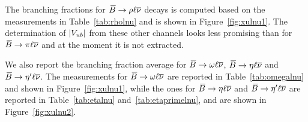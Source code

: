 The branching fractions for 
$\Bb\to \rho\ell\nub$ decays is computed based on the measurements in
Table~\ref{tab:rholnu} and is shown in Figure~\ref{fig:xulnu1}. The determination of $\Vub$
from these other channels looks less promising than for $\Bb\to\pi\ell\nub$ and at the moment it is not extracted.



We also report the branching fraction average for $\Bb\to\omega\ell\nub$, $\Bb\to\eta\ell\nub$ 
and $\Bb\to\eta'\ell\nub$. The measurements for $\Bb\to\omega\ell\nub$ are reported in Table~\ref{tab:omegalnu} 
and shown in Figure~\ref{fig:xulnu1}, while the ones for $\Bb\to\eta\ell\nub$ and  $\Bb\to\eta'\ell\nub$ are reported in Table~\ref{tab:etalnu} and~\ref{tab:etaprimelnu},  and are shown in Figure~\ref{fig:xulnu2}. 





